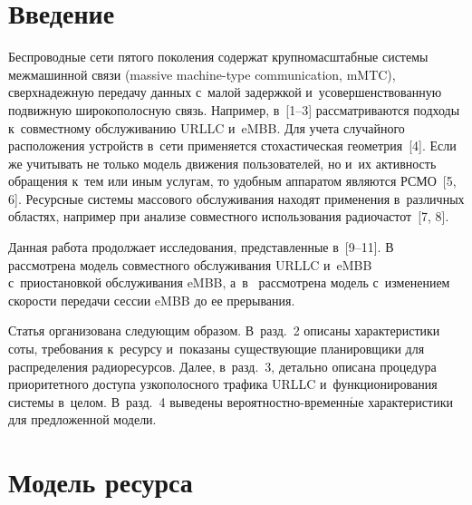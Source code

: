 
  
\vspace*{-2pt}



\thispagestyle{headings}

\begin{multicols}{2}

\label{st\stat}
  
\section{Введение}

  Беспроводные сети пятого поколения содержат крупномасштабные 
системы межмашинной связи (massive machine-type communication, mMTC), 
сверхнадежную передачу данных с~малой задержкой  и~усовершенствованную подвижную широкополосную 
связь. Например, в~[1--3] рас\-смат\-ри\-ва\-ют\-ся 
подходы к~совместному обслуживанию URLLC и~eMBB. Для учета случайного 
расположения устройств в~сети применяется стохастическая геометрия~[4]. 
Если же учитывать не только модель движения пользователей, но и~их 
активность обращения к~тем или иным услугам, то удобным аппаратом 
являются РСМО~[5, 6]. 
Ресурсные сис\-те\-мы массового обслуживания находят применения в~различных областях, например при 
анализе совместного использования радиочастот~[7, 8]. 
  
  Данная работа продолжает исследования, представленные в~[9--11]. 
В~\cite{9-koc} рас\-смот\-ре\-на модель совместного обслуживания URLLC и~eMBB 
с~приостановкой обслуживания eMBB, а~в~\cite{10-koc} рас\-смот\-ре\-на модель 
с~изменением скорости передачи сессии eMBB до ее прерывания.
  
  Статья организована сле\-ду\-ющим образом. В~разд.~2 описаны 
характеристики соты, требования к~ресурсу и~показаны существующие 
планировщики для распределения радиоресурсов. Далее, в~разд.~3, детально 
описана процедура приоритетного доступа узкополосного трафика URLLC 
и~функционирования системы в~целом. В~разд.~4 
выведены ве\-ро\-ят\-ност\-но-вре\-мен\-н$\acute{\mbox{ы}}$е характеристики для предложенной модели.

\vspace*{-7pt}
  
\section{Модель ресурса}


\end{multicols}
